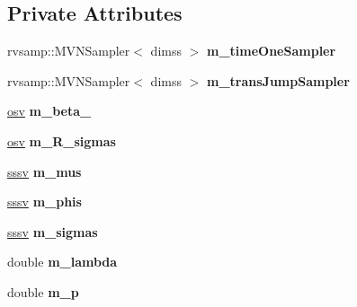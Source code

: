 \subsection*{Private Attributes}
\begin{DoxyCompactItemize}
\item 
\mbox{\label{classmsl1__rbbpf_a1d0b942c3817a5c6c861d53e66f3aa76}} 
rvsamp\+::\+M\+V\+N\+Sampler$<$ dimss $>$ {\bfseries m\+\_\+time\+One\+Sampler}
\item 
\mbox{\label{classmsl1__rbbpf_addecc8b0c7c9d6532c0961a9c778d0c1}} 
rvsamp\+::\+M\+V\+N\+Sampler$<$ dimss $>$ {\bfseries m\+\_\+trans\+Jump\+Sampler}
\item 
\mbox{\label{classmsl1__rbbpf_a128534877e559381b435b488422cb6bc}} 
\hyperlink{classmsl1__rbbpf_a23daf10ba0f0b6fead88bc83b4fa27a3}{osv} {\bfseries m\+\_\+beta\+\_}
\item 
\mbox{\label{classmsl1__rbbpf_aef3e3a7e949c640045659a6e813f43e0}} 
\hyperlink{classmsl1__rbbpf_a23daf10ba0f0b6fead88bc83b4fa27a3}{osv} {\bfseries m\+\_\+\+R\+\_\+sigmas}
\item 
\mbox{\label{classmsl1__rbbpf_a45f4f995c0f91f9b30088616eff11df4}} 
\hyperlink{classmsl1__rbbpf_a6703c548bb85bbe8e5a6baa723e8f0bb}{sssv} {\bfseries m\+\_\+mus}
\item 
\mbox{\label{classmsl1__rbbpf_a72053c3c72df5bef10b9c6c2036c8703}} 
\hyperlink{classmsl1__rbbpf_a6703c548bb85bbe8e5a6baa723e8f0bb}{sssv} {\bfseries m\+\_\+phis}
\item 
\mbox{\label{classmsl1__rbbpf_a1f785c123596b75c70d0b3387913c908}} 
\hyperlink{classmsl1__rbbpf_a6703c548bb85bbe8e5a6baa723e8f0bb}{sssv} {\bfseries m\+\_\+sigmas}
\item 
\mbox{\label{classmsl1__rbbpf_add75fb272d7770dc065d15b88b0d17f3}} 
double {\bfseries m\+\_\+lambda}
\item 
\mbox{\label{classmsl1__rbbpf_aaea7cf02f6d06a6fbd75416a350e8dce}} 
double {\bfseries m\+\_\+p}
\item 

\end{DoxyCompactItemize}
